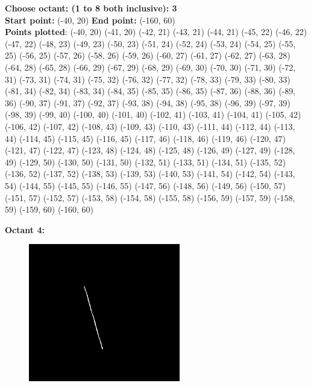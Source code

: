 \documentclass[12pt,letterpaper]{article}
\begin{document}
\textbf{Choose octant: (1 to 8 both inclusive): 3}\\
\textbf{Start point:} (-40, 20)
\textbf{End point:} (-160, 60)\\
\textbf{Points plotted}:
(-40, 20) (-41, 20) (-42, 21) (-43, 21) 
(-44, 21) (-45, 22) (-46, 22) (-47, 22) 
(-48, 23) (-49, 23) (-50, 23) (-51, 24) 
(-52, 24) (-53, 24) (-54, 25) (-55, 25) 
(-56, 25) (-57, 26) (-58, 26) (-59, 26) 
(-60, 27) (-61, 27) (-62, 27) (-63, 28) 
(-64, 28) (-65, 28) (-66, 29) (-67, 29) 
(-68, 29) (-69, 30) (-70, 30) (-71, 30) 
(-72, 31) (-73, 31) (-74, 31) (-75, 32) 
(-76, 32) (-77, 32) (-78, 33) (-79, 33) 
(-80, 33) (-81, 34) (-82, 34) (-83, 34) 
(-84, 35) (-85, 35) (-86, 35) (-87, 36) 
(-88, 36) (-89, 36) (-90, 37) (-91, 37) 
(-92, 37) (-93, 38) (-94, 38) (-95, 38) 
(-96, 39) (-97, 39) (-98, 39) (-99, 40) 
(-100, 40) (-101, 40) (-102, 41) (-103, 41) 
(-104, 41) (-105, 42) (-106, 42) (-107, 42) 
(-108, 43) (-109, 43) (-110, 43) (-111, 44) 
(-112, 44) (-113, 44) (-114, 45) (-115, 45) 
(-116, 45) (-117, 46) (-118, 46) (-119, 46) 
(-120, 47) (-121, 47) (-122, 47) (-123, 48) 
(-124, 48) (-125, 48) (-126, 49) (-127, 49) 
(-128, 49) (-129, 50) (-130, 50) (-131, 50) 
(-132, 51) (-133, 51) (-134, 51) (-135, 52) 
(-136, 52) (-137, 52) (-138, 53) (-139, 53) 
(-140, 53) (-141, 54) (-142, 54) (-143, 54) 
(-144, 55) (-145, 55) (-146, 55) (-147, 56) 
(-148, 56) (-149, 56) (-150, 57) (-151, 57) 
(-152, 57) (-153, 58) (-154, 58) (-155, 58) 
(-156, 59) (-157, 59) (-158, 59) (-159, 60) 
(-160, 60) 


\newpage
\textbf{Octant 4:}
\begin{figure}[h]
    \centering
    \includegraphics[height=6cm]{Outputs/O4-1.png}
\end{figure}
\end{document}
